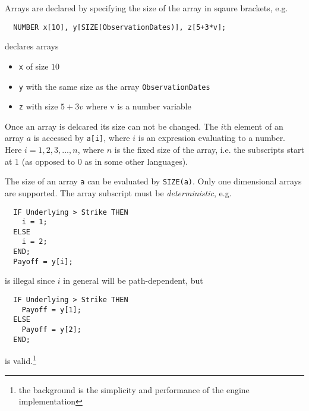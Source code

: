 \label{arrays}

Arrays are declared by specifying the size of the array in sqaure brackets, e.g.

\begin{verbatim}
  NUMBER x[10], y[SIZE(ObservationDates)], z[5+3*v];
\end{verbatim}

declares arrays

\begin{itemize}
\item \verb+x+ of size $10$
\item \verb+y+ with the same size as the array \verb+ObservationDates+
\item \verb+z+ with size $5+3v$ where v is a number variable
\end{itemize}

Once an array is delcared its size can not be changed. The $i$th element of an array $a$ is accessed by \verb+a[i]+,
where $i$ is an expression evaluating to a number. Here $i=1,2,3,\ldots,n$, where $n$ is the fixed size of the array,
i.e. the subscripts start at $1$ (as opposed to $0$ as in some other languages).

The size of an array \verb+a+ can be evaluated by \verb+SIZE(a)+. Only one dimensional arrays are supported. The array
subscript must be {\em deterministic}, e.g.

\begin{verbatim}
  IF Underlying > Strike THEN
    i = 1;
  ELSE
    i = 2;
  END;
  Payoff = y[i];
\end{verbatim}
  
is illegal since $i$ in general will be path-dependent, but
  
\begin{verbatim}
  IF Underlying > Strike THEN
    Payoff = y[1];
  ELSE
    Payoff = y[2];
  END;
\end{verbatim}

is valid.\footnote{the background is the simplicity and performance of the engine implementation}

\label{sorting_arrays}

